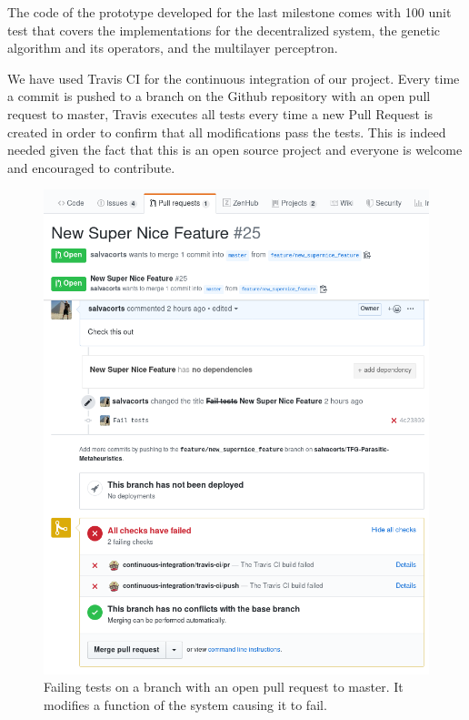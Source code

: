 The code of the prototype developed for the last milestone comes with 100 unit test that covers the implementations for the decentralized system, the genetic algorithm and its operators, and the multilayer perceptron.

We have used Travis CI for the continuous integration of our project. Every time a commit is pushed to a branch on the Github repository with an open pull request to master, Travis executes all tests every time a new Pull Request is created in order to confirm that all modifications pass the tests. This is indeed needed given the fact that this is an open source project and everyone is welcome and encouraged to contribute.

\begin{figure}[h!]
		\centering
    	\includegraphics[scale=0.4]{assets/images/travis_example.png}
    	\caption{Failing tests on a branch with an open pull request to master. It modifies a function of the system causing it to fail.}
    	\label{fig:travis}
\end{figure}
